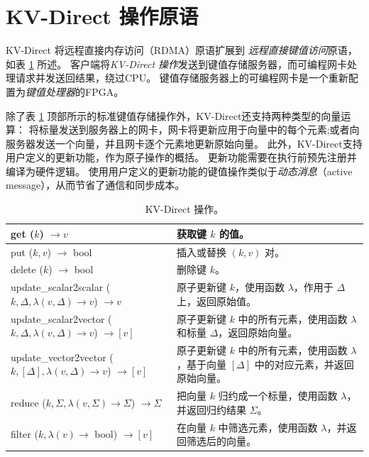\section{KV-Direct 操作原语}
\label{kvdirect:sec:architecture}
\label{kvdirect:sec:kv-operations}

KV-Direct 将远程直接内存访问（RDMA）原语扩展到 \textit {远程直接键值访问}原语，如表 \ref {kvdirect:tab:kv-operations} 所述。
客户端将\textit {KV-Direct 操作}发送到键值存储服务器，而可编程网卡处理请求并发送回结果，绕过CPU。
键值存储服务器上的可编程网卡是一个重新配置为\textit {键值处理器}的FPGA。

除了表 \ref {kvdirect:tab:kv-operations} 顶部所示的标准键值存储操作外，KV-Direct还支持两种类型的向量运算：
将标量发送到服务器上的网卡，网卡将更新应用于向量中的每个元素;或者向服务器发送一个向量，并且网卡逐个元素地更新原始向量。
此外，KV-Direct支持用户定义的更新功能，作为原子操作的概括。
更新功能需要在执行前预先注册并编译为硬件逻辑。
使用用户定义的更新功能的键值操作类似于\textit {动态消息}（active message）\cite {eicken1992active}，从而节省了通信和同步成本。


\begin{table}
\centering
\caption{KV-Direct 操作。}
\label{kvdirect:tab:kv-operations}
\small
\begin{tabular}{p{}|p{} }
\toprule
get ($k$) $\rightarrow v$ & 获取键 $k$ 的值。 \\
\midrule
put ($k, v$) $\rightarrow$ bool & 插入或替换 $(k, v)$ 对。 \\
\midrule
delete ($k$) $\rightarrow$ bool & 删除键 $k$。 \\
\midrule
\midrule
update{\_}scalar2scalar ($k, \Delta, \lambda(v, \Delta) \rightarrow v$) $\rightarrow v$ & 原子更新键 $k$，使用函数 $\lambda$，作用于 $\Delta$ 上，返回原始值。\\
\midrule
update{\_}scalar2vector ($k, \Delta, \lambda(v, \Delta) \rightarrow v$) $\rightarrow [v]$ & 原子更新键 $k$ 中的所有元素，使用函数 $\lambda$ 和标量 $\Delta$，返回原始向量。 \\
\midrule
update{\_}vector2vector ($k, [\Delta], \lambda(v, \Delta) \rightarrow v$) $\rightarrow [v]$ & 原子更新键 $k$ 中的所有元素，使用函数 $\lambda$，基于向量 $[\Delta]$ 中的对应元素，并返回原始向量。 \\
\midrule
reduce ($k, \Sigma, \lambda(v, \Sigma) \rightarrow \Sigma$) $\rightarrow \Sigma$ & 把向量 $k$ 归约成一个标量，使用函数 $\lambda$，并返回归约结果 $\Sigma$。 \\
\midrule
filter ($k, \lambda(v) \rightarrow$ bool) $\rightarrow [v]$ & 在向量 $k$ 中筛选元素，使用函数 $\lambda$，并返回筛选后的向量。 \\
\bottomrule
\end{tabular}
\end{table}

